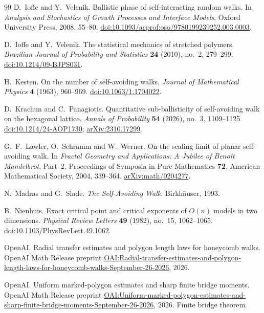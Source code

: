 \begin{thebibliography}{99}
 D.~Ioffe and Y.~Velenik. Ballistic phase of self-interacting random walks. In \emph{Analysis and Stochastics of Growth Processes and Interface Models}, Oxford University Press, 2008, 55--80. \href{https://doi.org/10.1093/acprof:oso/9780199239252.003.0003}{doi:10.1093/acprof:oso/9780199239252.003.0003}.

 D.~Ioffe and Y.~Velenik. The statistical mechanics of stretched polymers. \emph{Brazilian Journal of Probability and Statistics} \textbf{24} (2010), no.~2, 279--299. \href{https://doi.org/10.1214/09-BJPS031}{doi:10.1214/09-BJPS031}.

 H.~Kesten. On the number of self-avoiding walks. \emph{Journal of Mathematical Physics} \textbf{4} (1963), 960--969. \href{https://doi.org/10.1063/1.1704022}{doi:10.1063/1.1704022}.

 D.~Krachun and C.~Panagiotis. Quantitative sub-ballisticity of self-avoiding walk on the hexagonal lattice. \emph{Annals of Probability} \textbf{54} (2026), no.~3, 1109--1125. \href{https://doi.org/10.1214/24-AOP1730}{doi:10.1214/24-AOP1730}; \href{https://arxiv.org/abs/2310.17299}{arXiv:2310.17299}.

 G.~F.~Lawler, O.~Schramm and W.~Werner. On the scaling limit of planar self-avoiding walk. In \emph{Fractal Geometry and Applications: A Jubilee of Beno\^it Mandelbrot}, Part~2, Proceedings of Symposia in Pure Mathematics \textbf{72}, American Mathematical Society, 2004, 339--364. \href{https://arxiv.org/abs/math/0204277}{arXiv:math/0204277}.

 N.~Madras and G.~Slade. \emph{The Self-Avoiding Walk}. Birkh\"auser, 1993.

 B.~Nienhuis. Exact critical point and critical exponents of $O(n)$ models in two dimensions. \emph{Physical Review Letters} \textbf{49} (1982), no.~15, 1062--1065. \href{https://doi.org/10.1103/PhysRevLett.49.1062}{doi:10.1103/PhysRevLett.49.1062}.

OpenAI.
Radial transfer estimates and polygon length laws for honeycomb walks.
OpenAI Math Release preprint
\href{https://github.com/openai/math/blob/main/preprints/Radial-transfer-estimates-and-polygon-length-laws-for-honeycomb-walks-September-26-2026/main.pdf}{OAI:Radial-transfer-estimates-and-polygon-length-laws-for-honeycomb-walks-September-26-2026},
2026.

OpenAI.
Uniform marked-polygon estimates and sharp finite bridge moments.
OpenAI Math Release preprint
\href{https://github.com/openai/math/blob/main/preprints/Uniform-marked-polygon-estimates-and-sharp-finite-bridge-moments-September-26-2026/main.pdf}{OAI:Uniform-marked-polygon-estimates-and-sharp-finite-bridge-moments-September-26-2026},
2026. Finite bridge theorem.


\end{thebibliography}
